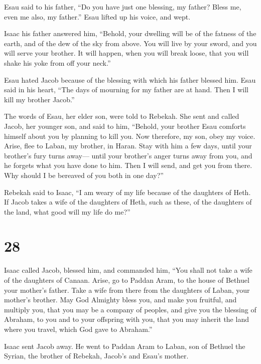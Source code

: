  Esau said to his father, ``Do you have just one
blessing, my father? Bless me, even me also, my father.'' Esau lifted up
his voice, and wept.

 Isaac his father answered him, ``Behold, your dwelling
will be of the fatness of the earth, and of the dew of the sky from
above.  You will live by your sword, and you will serve
your brother. It will happen, when you will break loose, that you will
shake his yoke from off your neck.''

 Esau hated Jacob because of the blessing with which his
father blessed him. Esau said in his heart, ``The days of mourning for
my father are at hand. Then I will kill my brother Jacob.''

 The words of Esau, her elder son, were told to Rebekah.
She sent and called Jacob, her younger son, and said to him, ``Behold,
your brother Esau comforts himself about you by planning to kill you.
 Now therefore, my son, obey my voice. Arise, flee to
Laban, my brother, in Haran.  Stay with him a few days,
until your brother's fury turns away---  until your
brother's anger turns away from you, and he forgets what you have done
to him. Then I will send, and get you from there. Why should I be
bereaved of you both in one day?''

 Rebekah said to Isaac, ``I am weary of my life because
of the daughters of Heth. If Jacob takes a wife of the daughters of
Heth, such as these, of the daughters of the land, what good will my
life do me?''

\hypertarget{section-27}{%
\section{28}\label{section-27}}

 Isaac called Jacob, blessed him, and commanded him, ``You
shall not take a wife of the daughters of Canaan.  Arise,
go to Paddan Aram, to the house of Bethuel your mother's father. Take a
wife from there from the daughters of Laban, your mother's brother.
 May God Almighty bless you, and make you fruitful, and
multiply you, that you may be a company of peoples,  and
give you the blessing of Abraham, to you and to your offspring with you,
that you may inherit the land where you travel, which God gave to
Abraham.''

 Isaac sent Jacob away. He went to Paddan Aram to Laban,
son of Bethuel the Syrian, the brother of Rebekah, Jacob's and Esau's
mother.

